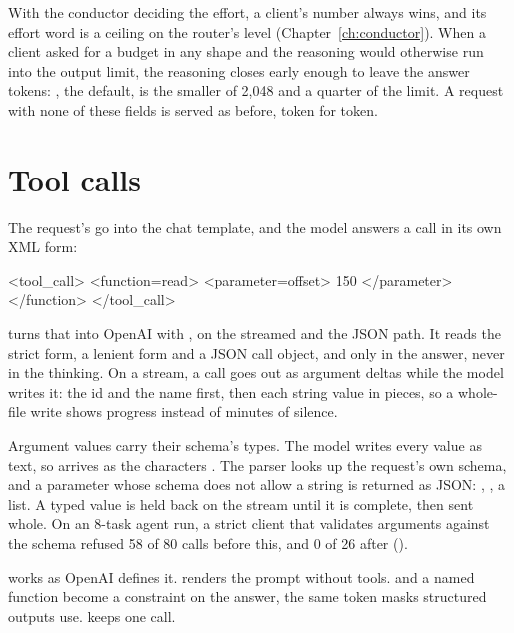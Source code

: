 With the conductor deciding the effort, a client's number always wins, and its effort word is a ceiling on the router's level (Chapter~\ref{ch:conductor}). When a client asked for a budget in any shape and the reasoning would otherwise run into the output limit, the reasoning closes early enough to leave the answer  tokens: , the default, is the smaller of 2,048 and a quarter of the limit. A request with none of these fields is served as before, token for token.

\section{Tool calls}

The request's  go into the chat template, and the model answers a call in its own XML form:

\begin{plain}
<tool_call>
<function=read>
<parameter=offset>
150
</parameter>
</function>
</tool_call>
\end{plain}

 turns that into OpenAI  with , on the streamed and the JSON path. It reads the strict form, a lenient form and a JSON call object, and only in the answer, never in the thinking. On a stream, a call goes out as argument deltas while the model writes it: the id and the name first, then each string value in pieces, so a whole-file write shows progress instead of minutes of silence.

Argument values carry their schema's types. The model writes every value as text, so  arrives as the characters . The parser looks up the request's own schema, and a parameter whose schema does not allow a string is returned as JSON: , , a list. A typed value is held back on the stream until it is complete, then sent whole. On an 8-task agent run, a strict client that validates arguments against the schema refused 58 of 80 calls before this, and 0 of 26 after (\measured).

 works as OpenAI defines it.  renders the prompt without tools.  and a named function become a constraint on the answer, the same token masks structured outputs use.  keeps one call.

